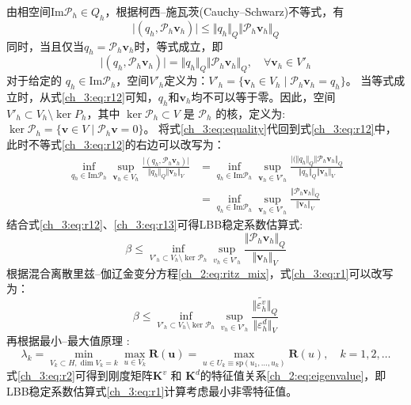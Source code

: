 由相空间$\mathrm{Im}\mathcal P_h \in Q_h$，根据柯西--施瓦茨(Cauchy--Schwarz)不等式\cite{philippeg.2013}，有
\begin{equation}
    \vert (q_h,\mathcal P_h \boldsymbol v_h) \vert \le \Vert q_h \Vert_Q \Vert \mathcal P_h \boldsymbol v_h \Vert_Q
\end{equation}
同时，当且仅当$q_h=\mathcal P_h \boldsymbol v_h$时，等式成立，即
\begin{equation}\label{ch_3:eq:equality}
    \vert (q_h,\mathcal P_h \boldsymbol v_h) \vert = \Vert q_h \Vert_Q \Vert \mathcal P_h \boldsymbol v_h \Vert_Q, \quad \forall \boldsymbol v_h \in V'_h
\end{equation}
对于给定的 $q_h\in \mathrm{Im}\mathcal P_h$，空间$V'_h$定义为：$V'_h = \{ \boldsymbol v_h \in V_h \; \vert \; \mathcal P_h \boldsymbol v_h = q_h \}$。
当等式成立时，从式\eqref{ch_3:eq:r12}可知，$q_h$和$\boldsymbol v_h$均不可以等于零。因此，空间$V'_h \subset V_h\setminus \ker P_h$，其中 $\ker \mathcal P_h \subset V$ 是 $\mathcal P_h$ 的核，定义为: $\ker \mathcal P_h = \{ \boldsymbol v \in V \;\vert\; \mathcal P_h \boldsymbol v = 0 \}$。
将式\eqref{ch_3:eq:equality}代回到式\eqref{ch_3:eq:r12}中，此时不等式\eqref{ch_3:eq:r12}的右边可以改写为：
\begin{equation}\label{ch_3:eq:r13}
    \begin{split}
    \inf_{q_h \in \mathrm{Im}\mathcal P_h}\sup_{\boldsymbol v_h\in V_h} \frac{\vert (q_h,\mathcal P_h \boldsymbol v_h) \vert}{\Vert q_h \Vert_Q \Vert \boldsymbol v_h \Vert_V} &=
    \inf_{q_h \in \mathrm{Im}\mathcal P_h}\sup_{\boldsymbol v_h\in V'_h} \frac{\vert (\Vert q_h \Vert_Q \Vert \mathcal P_h \boldsymbol v_h \Vert_Q}{\Vert q_h \Vert_Q \Vert \boldsymbol v_h \Vert_V} \\
    &=\inf_{q_h \in \mathrm{Im}\mathcal P_h}\sup_{\boldsymbol v_h\in V'_h} \frac{\Vert \mathcal P_h 
    \boldsymbol v_h \Vert_Q}{\Vert \boldsymbol v_h \Vert_V} 
    \end{split}
\end{equation}
结合式\eqref{ch_3:eq:r12}、\eqref{ch_3:eq:r13}可得LBB稳定系数估算式:
\begin{equation}\label{ch_3:eq:r1}
    \beta \le \inf_{V'_h \subset V_h \setminus \ker \mathcal P_h} \sup_{v_h \in V'_h} \frac{\Vert \mathcal P_h \boldsymbol v_h \Vert_Q}{\Vert \boldsymbol v_h \Vert_V}
\end{equation}
根据混合离散里兹–伽辽金变分方程\eqref{ch_2:eq:ritz_mix}，式\eqref{ch_3:eq:r1}可以改写为：
\begin{equation}\label{ch_3:eq:r2}
    \beta \le \inf_{V'_h \subset V_h \setminus \ker \mathcal P_h} \sup_{v_h \in V'_h} \frac{\Vert\tilde{\varepsilon^v_h}\Vert_Q}{\Vert \varepsilon^d_h\Vert_V}
\end{equation}
再根据最小--最大值原理 \cite{babuska1991a}:
\begin{equation}
    \lambda_k = \min_{{V_k\subset H},{\dim V_k=k}}\max_{u\in V_k}\boldsymbol{R(u)} = \max_{u\in U_k \equiv \text{sp}(u_1,\dots,u_k)}\boldsymbol{R}(u),\quad k=1,2,\dots
\end{equation}
式\eqref{ch_3:eq:r2}可得到刚度矩阵$\boldsymbol K^v$ 和 $\boldsymbol K^d$的特征值关系\eqref{ch_2:eq:eigenvalue}，即LBB稳定系数估算式\eqref{ch_3:eq:r1}计算考虑最小非零特征值。

